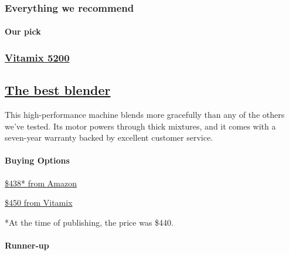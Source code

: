 \hypertarget{everything-we-recommend}{%
\subsubsection{Everything we recommend}\label{everything-we-recommend}}

\hypertarget{our-pick-1}{%
\paragraph{Our pick}\label{our-pick-1}}

\href{https://www.nytimes3xbfgragh.onion/wirecutter/out/link/7761/112178/4/109194?merchant=Amazon}{}

\hypertarget{vitamix-5200-1}{%
\subsubsection{\texorpdfstring{\href{https://www.nytimes3xbfgragh.onion/wirecutter/out/link/7761/112178/4/109194?merchant=Amazon}{Vitamix
5200}}{Vitamix 5200}}\label{vitamix-5200-1}}

\hypertarget{the-best-blender-2}{%
\subsection{\texorpdfstring{\href{https://www.nytimes3xbfgragh.onion/wirecutter/out/link/7761/112178/4/109194?merchant=Amazon}{The
best blender}}{The best blender}}\label{the-best-blender-2}}

This high-performance machine blends more gracefully than any of the
others we've tested. Its motor powers through thick mixtures, and it
comes with a seven-year warranty backed by excellent customer service.

\hypertarget{buying-options-4}{%
\paragraph{Buying Options}\label{buying-options-4}}

\href{https://www.nytimes3xbfgragh.onion/wirecutter/out/link/7761/112178/4/109194?merchant=Amazon}{\$438*
from Amazon}

\href{https://www.nytimes3xbfgragh.onion/wirecutter/out/link/7761/149373/4/109194?merchant=Vitamix}{\$450
from Vitamix}

*At the time of publishing, the price was \$440.

\hypertarget{runner-up-1}{%
\paragraph{Runner-up}\label{runner-up-1}}

